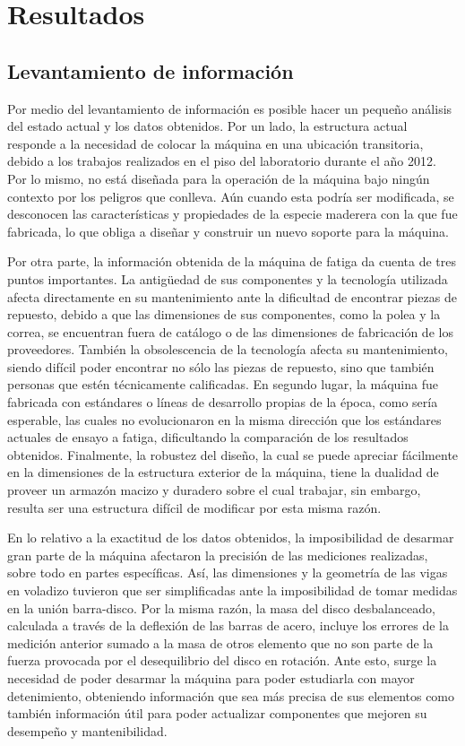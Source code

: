 \chapter{Resultados}

\section{Levantamiento de información}
Por medio del levantamiento de información es posible hacer un pequeño análisis del estado actual y los datos obtenidos. Por un lado, la estructura actual responde a la necesidad de colocar la máquina en una ubicación transitoria, debido a los trabajos realizados en el piso del laboratorio durante el año 2012. Por lo mismo, no está diseñada para la operación de la máquina bajo ningún contexto por los peligros que conlleva. Aún cuando esta podría ser modificada, se desconocen las características y propiedades de la especie maderera con la que fue fabricada, lo que obliga a diseñar y construir un nuevo soporte para la máquina. 

Por otra parte, la información obtenida de la máquina de fatiga da cuenta de tres puntos importantes. La antigüedad de sus componentes y la tecnología utilizada afecta directamente en su mantenimiento ante la dificultad de encontrar piezas de repuesto, debido a que las dimensiones de sus componentes, como la polea y la correa, se encuentran fuera de catálogo o de las dimensiones de fabricación de los proveedores. También la obsolescencia de la tecnología afecta su mantenimiento, siendo difícil poder encontrar no sólo las piezas de repuesto, sino que también personas que estén técnicamente calificadas. En segundo lugar, la máquina fue fabricada con estándares o líneas de desarrollo propias de la época, como sería esperable, las cuales no evolucionaron en la misma dirección que los estándares actuales de ensayo a fatiga, dificultando la comparación de los resultados obtenidos. Finalmente, la robustez del diseño, la cual se puede apreciar fácilmente en la dimensiones de la estructura exterior de la máquina, tiene la dualidad de proveer un armazón macizo y duradero sobre el cual trabajar, sin embargo, resulta ser una estructura difícil de modificar por esta misma razón.

En lo relativo a la exactitud de los datos obtenidos, la imposibilidad de desarmar gran parte de la máquina afectaron la precisión de las mediciones realizadas, sobre todo en partes específicas. Así, las dimensiones y la geometría de las vigas en voladizo tuvieron que ser simplificadas ante la imposibilidad de tomar medidas en la unión barra-disco. Por la misma razón, la masa del disco desbalanceado, calculada a través de la deflexión de las barras de acero, incluye los errores de la medición anterior sumado a la masa de otros elemento que no son parte de la fuerza provocada por el desequilibrio del disco en rotación. Ante esto, surge la necesidad de poder desarmar la máquina para poder estudiarla con mayor detenimiento, obteniendo información que sea más precisa de sus elementos como también información útil para poder actualizar componentes que mejoren su desempeño y mantenibilidad. 
 
